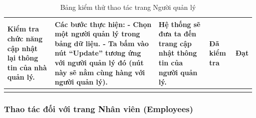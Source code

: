\documentclass{article}
\begin{document}
\begin{longtable}{ | p{} |p{} | p{}  | p{}  | p{}  | }
\hline
Kiểm tra chức năng cập nhật lại thông tin của nhà quản lý. &
Các bước thực hiện: \newline
- Chọn một người quản lý trong bảng dữ liệu.     \newline
- Ta bấm vào nút “Update” tương ứng với người quản lý đó (nút này sẽ nằm cùng hàng với người quản lý). 
&
Hệ thống sẽ đưa ta đến trang cập nhật thông tin của người quản lý. &
Đã kiểm tra &
Đạt \\

\hline
\caption{Bảng kiểm thử thao tác trang Người quản lý}
\end{longtable}


\subsubsection{Thao tác đối với trang Nhân viên (Employees)}
\end{document}
